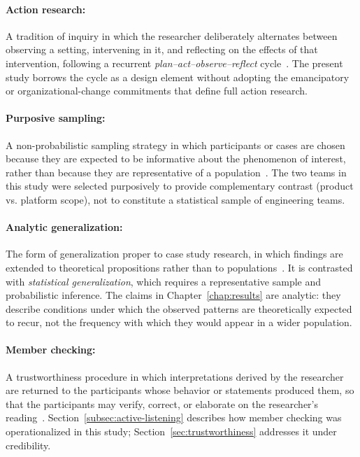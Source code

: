 \paragraph{Action research:} A tradition of inquiry in which the researcher
deliberately alternates between observing a setting, intervening in it, and
reflecting on the effects of that intervention, following a recurrent
\emph{plan--act--observe--reflect} cycle~\citep{robson2016}. The present study
borrows the cycle as a design element without
adopting the emancipatory or organizational-change commitments that define
full action research.

\paragraph{Purposive sampling:} A non-probabilistic sampling strategy in which
participants or cases are chosen because they are expected to be informative
about the phenomenon of interest, rather than because they are representative
of a population~\citep{robson2016}. The two teams in this study were selected
purposively to provide complementary contrast (product vs. platform scope),
not to constitute a statistical sample of engineering teams.

\paragraph{Analytic generalization:} The form of generalization proper to case
study research, in which findings are extended to theoretical propositions
rather than to populations~\citep{robson2016,yin2009}. It is contrasted with
\emph{statistical generalization}, which requires a representative sample and
probabilistic inference. The claims in Chapter~\ref{chap:results} are analytic:
they describe conditions under which the observed patterns are theoretically
expected to recur, not the frequency with which they would appear in a wider
population.

\paragraph{Member checking:} A trustworthiness procedure in which
interpretations derived by the researcher are returned to the participants
whose behavior or statements produced them, so that the participants may
verify, correct, or elaborate on the researcher's reading~\citep{robson2016}.
Section~\ref{subsec:active-listening} describes how member checking was
operationalized in this study; Section~\ref{sec:trustworthiness} addresses it
under credibility.

